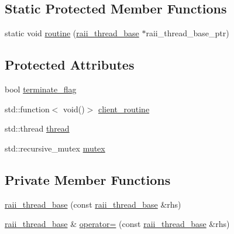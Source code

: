\subsection*{Static Protected Member Functions}
\begin{DoxyCompactItemize}
\item 
static void \hyperlink{classxstd_1_1raii__thread__base_aac990e420873b2bb520e677156c37978}{routine} (\hyperlink{classxstd_1_1raii__thread__base}{raii\-\_\-thread\-\_\-base} $\ast$raii\-\_\-thread\-\_\-base\-\_\-ptr)
\end{DoxyCompactItemize}
\subsection*{Protected Attributes}
\begin{DoxyCompactItemize}
\item 
bool \hyperlink{classxstd_1_1raii__thread__base_aaac3bfb5572d71de17cb71d7ed0bb15c}{terminate\-\_\-flag}
\item 
std\-::function$<$ void()$>$ \hyperlink{classxstd_1_1raii__thread__base_a6b3e160c7eb131008410a16c460b03ff}{client\-\_\-routine}
\item 
std\-::thread \hyperlink{classxstd_1_1raii__thread__base_a664b3c47514557c3047e4ee0d7d9f25f}{thread}
\item 
std\-::recursive\-\_\-mutex \hyperlink{classxstd_1_1raii__thread__base_a9d9e01fced1a4f58ea5a9cc165f54fe3}{mutex}
\end{DoxyCompactItemize}
\subsection*{Private Member Functions}
\begin{DoxyCompactItemize}
\item 
\hyperlink{classxstd_1_1raii__thread__base_abcff331991c469d9749a533324a1347c}{raii\-\_\-thread\-\_\-base} (const \hyperlink{classxstd_1_1raii__thread__base}{raii\-\_\-thread\-\_\-base} \&rhs)
\item 
\hyperlink{classxstd_1_1raii__thread__base}{raii\-\_\-thread\-\_\-base} \& \hyperlink{classxstd_1_1raii__thread__base_a587c349a3f976912f42a4e6fc607d3b0}{operator=} (const \hyperlink{classxstd_1_1raii__thread__base}{raii\-\_\-thread\-\_\-base} \&rhs)
\end{DoxyCompactItemize}


